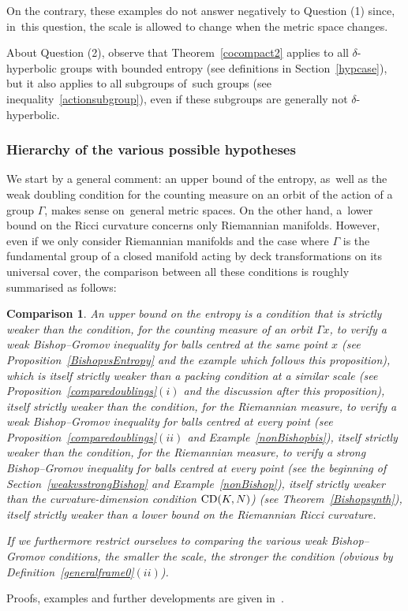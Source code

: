 \documentclass[10pt,a4paper]{amsart}
\numberwithin{equation}{section}
\newtheorem{compari}[theor]{Comparison}
\begin{document}
On the contrary, these examples do not answer negatively to Question (1) since, in~this question, the scale is allowed to change when the metric space
changes.

About Question (2), observe that Theorem~\ref{cocompact2} applies to all $\delta$-hyperbolic groups with bounded entropy (see definitions in Section~\ref{hypcase}), but it also applies to all subgroups of~such groups (see inequality~\eqref{actionsubgroup}), even if these subgroups are generally
not
$\delta$-hyperbolic.

\subsubsection{Hierarchy of the various possible hypotheses}\label{comparaison}
We start by a general comment: an upper bound of the entropy, as~well as the weak doubling condition for the counting measure on an orbit of the action of a group $ \Gamma $, makes sense on~gene\-ral metric spaces. On the
other hand, a~lower bound on the Ricci
curvature concerns only Riemannian manifolds.
However, even if we only consider Riemannian manifolds and the case where
$ \Gamma $ is the fundamental group of a closed manifold acting by deck transformations on its universal cover, the comparison between all these conditions is roughly summarised as follows:

\begin{compari}%
An upper bound on the entropy is a condition that is strictly weaker than
the condition, for the counting measure of an orbit $ \Gamma x $, to verify a weak
Bishop--Gromov inequality for balls centred at the same point $x$ (see Proposition~\ref{BishopvsEntropy} and the example which follows this proposition), which
 is itself strictly weaker than a packing condition at a similar scale (see Proposition~\ref{comparedoublings}$(i)$ and
the discussion after this proposition), itself strictly weaker than the condition, for the Riemannian measure, to verify a weak Bishop--Gromov inequality for balls centred
at every point (see Proposition~\ref{comparedoublings}$(ii)$ and Example~\ref{nonBishopbis}), itself strictly weaker than the condition, for the Riemannian measure, to verify a strong Bishop--Gromov inequality for balls centred at every point (see the beginning of Section~\ref{weakvsstrongBishop} and Example~\ref{nonBishop}), itself strictly weaker than the curvature-dimension condition ${\rm CD}(K,N)$) (see Theorem~\ref{Bishopsynth}), itself strictly weaker than a lower bound on the Riemannian Ricci curvature.

If we furthermore restrict ourselves to comparing the various weak Bishop--Gromov conditions, the smaller the scale, the stronger the condition (obvious
by Definition~\ref{generalframe0}$(ii)$).
\end{compari}
Proofs, examples and further developments are given in~\cite[Section~3.3]{BCGS}.
\end{document}
